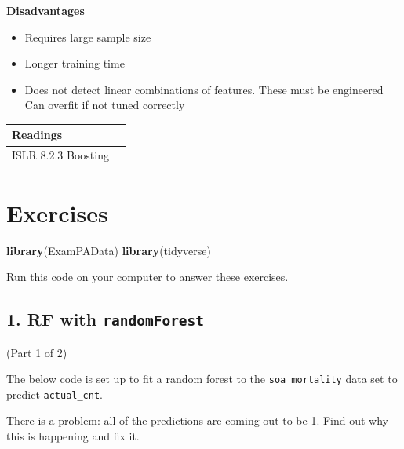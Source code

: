 \documentclass[openany]{book}
\newenvironment{Shaded}{\begin{snugshade}}{\end{snugshade}}
\newcommand{\KeywordTok}[1]{\textcolor[rgb]{0.13,0.29,0.53}{\textbf{#1}}}
\newcommand{\NormalTok}[1]{#1}
\providecommand{\tightlist}{%
  \setlength{\itemsep}{0pt}\setlength{\parskip}{0pt}}
\begin{document}
\textbf{Disadvantages}

\begin{itemize}
\tightlist
\item
  Requires large sample size
\item
  Longer training time
\item
  Does not detect linear combinations of features. These must be engineered
  Can overfit if not tuned correctly
\end{itemize}

\begin{longtable}[]{@{}ll@{}}
\toprule
Readings &\tabularnewline
\midrule
\endhead
ISLR 8.2.3 Boosting &\tabularnewline
\bottomrule
\end{longtable}

\hypertarget{exercises-1}{%
\section{Exercises}\label{exercises-1}}

\begin{Shaded}
\begin{Highlighting}[]
\KeywordTok{library}\NormalTok{(ExamPAData)}
\KeywordTok{library}\NormalTok{(tidyverse)}
\end{Highlighting}
\end{Shaded}

Run this code on your computer to answer these exercises.

\hypertarget{rf-with-randomforest}{%
\subsection{\texorpdfstring{1. RF with \texttt{randomForest}}{1. RF with randomForest}}\label{rf-with-randomforest}}

(Part 1 of 2)

The below code is set up to fit a random forest to the \texttt{soa\_mortality} data set to predict \texttt{actual\_cnt}.

There is a problem: all of the predictions are coming out to be 1. Find out why this is happening and fix it.
\end{document}
